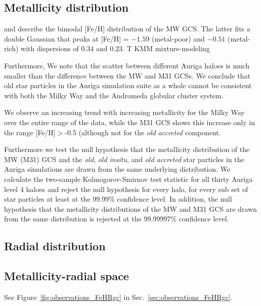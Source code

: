 \documentclass[a4paper,fleqn,usenatbib]{mnras}
\begin{document}
\subsection{Metallicity distribution}
\label{sec:discussion_FeH}
\citet[][p. 234]{1998gcs..book.....A} and \citet[][p. 38]{Harris2001} describe
the bimodal [Fe/H] distribution of the MW GCS. The latter fits a double
Gaussian that peaks at [Fe/H] = $-1.59$ (metal-poor) and $-0.51$ (metal-rich)
with dispersions of $0.34$ and $0.23$. T
KMM mixture-modeling

Furthermore, 
We note that the scatter between different
Auriga haloes is much smaller than the difference between the MW and M31 GCSs.
We conclude that old star particles in the Auriga simulation suite as a whole
cannot be consistent with both the Milky Way and the Andromeda globular cluster
system.

We observe an increasing trend with increasing metallicity
for the Milky Way over the entire range of the data, while the M31 GCS shows
this increase only in the range [Fe/H]$>$-0.5 (although not for the \emph{old
accreted} component.


Furthermore we test the null hypothesis that the metallicity distribution of the
MW (M31) GCS and the \emph{old}, \emph{old insitu}, and \emph{old accreted} star
particles in the Auriga simulations are drawn from the same underlying
distribution. We calculate the two-sample Kolmogorov-Smirnov test statistic for
all thirty Auriga level 4 haloes and reject the null hypothesis for every halo,
for every sub set of star particles at least at the 99.99\% confidence level.
In addition, the null hypothesis that the metallicity distributions of the MW
and M31 GCS are drawn from the same distribution is rejected at the 99.99997\%
confidence level.


\subsection{Radial distribution}
\label{sec:discussion_Rgc}

\subsection{Metallicity-radial space}
\label{sec:discussion_FeHRgc}
See Figure~\ref{fig:observations_FeHRgc} in Sec.~\ref{sec:observations_FeHRgc}.


\end{document}
